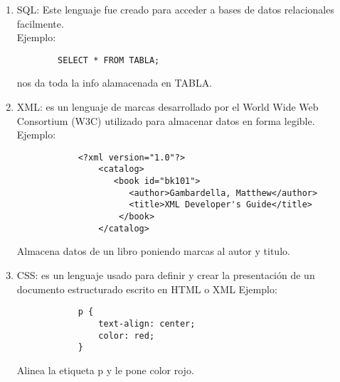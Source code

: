 \documentclass{article}
\begin{document}
\begin{enumerate}
  \item SQL: Este lenguaje fue creado para acceder a bases de datos relacionales facilmente.\\
  		Ejemplo:\\  
		\begin{verbatim}
  		SELECT * FROM TABLA; 
  		\end{verbatim}
  		nos da toda la info alamacenada en TABLA.
  \item XML: es un lenguaje de marcas desarrollado por el World Wide Web Consortium (W3C) utilizado para almacenar datos en forma legible.\\
  		Ejemplo:
  		\begin{verbatim}
	  		<?xml version="1.0"?>
				<catalog>
				   <book id="bk101">
				      <author>Gambardella, Matthew</author>
				      <title>XML Developer's Guide</title>
				    </book>
				</catalog>
		\end{verbatim}
		Almacena datos de un libro poniendo marcas al autor y titulo.
  \item CSS: es un lenguaje usado para definir y crear la presentación de un documento estructurado escrito en HTML o XML
  Ejemplo:
		\begin{verbatim}
	  		p {
			    text-align: center;
			    color: red;
			} 
		\end{verbatim}
		Alinea la etiqueta p y le pone color rojo.
\end{enumerate}
\end{document}
